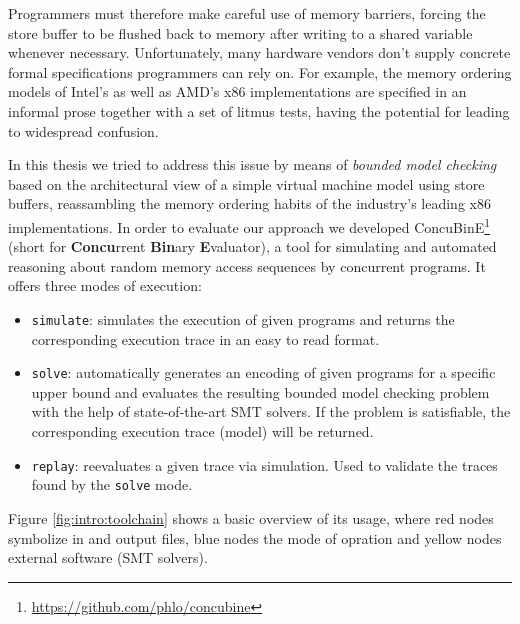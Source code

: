 Programmers must therefore make careful use of memory barriers,
forcing the store buffer to be flushed back to memory after writing to a shared variable whenever necessary.
Unfortunately, many hardware vendors don't supply concrete formal specifications programmers can rely on.
For example, the memory ordering models of Intel's \cite{ref:Intel} as well as AMD's \cite{ref:AMD} x86 implementations are specified in an informal prose together with a set of litmus tests, having the potential for leading to widespread confusion.


\newpage

In this thesis we tried to address this issue by
means of \emph{bounded model checking} \cite{ref:BMC}
based on the architectural view of a simple virtual machine model using store buffers,
reassambling the memory ordering habits of
the industry's leading
x86 implementations.
In order to evaluate our approach we developed
ConcuBinE\footnote{\url{https://github.com/phlo/concubine}} (short for \textbf{Concu}rrent \textbf{Bin}ary \textbf{E}valuator),
a tool for simulating and
automated reasoning about
random memory access sequences by
concurrent programs.
It offers three modes of execution:
\begin{itemize}
  \item \texttt{simulate}:
    simulates the execution of given programs and returns the corresponding execution trace in an easy to read format.
  \item \texttt{solve}:
    automatically generates an encoding of given programs for a specific upper bound and evaluates the resulting bounded model checking problem with the help of state-of-the-art SMT solvers.
    If the problem is satisfiable, the corresponding execution trace (model) will be returned.
  \item \texttt{replay}:
    reevaluates a given trace via simulation.
    Used to validate the traces found by the \texttt{solve} mode.
\end{itemize}
Figure \ref{fig:intro:toolchain} shows a basic overview of its usage,
where red nodes symbolize in and output files,
blue nodes the mode of opration
and yellow nodes external software (SMT solvers).

